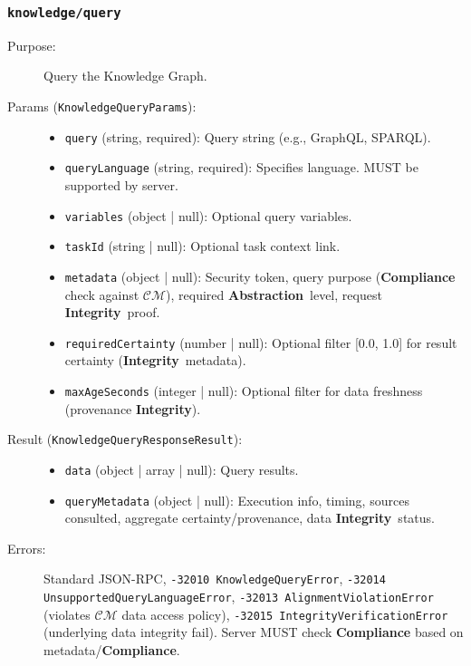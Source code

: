 \documentclass[12pt,a4paper]{report}
\newcommand{\Integrity}{\textbf{Integrity}}
\newcommand{\Abstraction}{\textbf{Abstraction}}
\begin{document}
	\subsubsection{\texttt{knowledge/query}}
	\label{app:oami_kg_query}
	\begin{description}
		\item[Purpose:] Query the Knowledge Graph.
		\item[Params (\texttt{KnowledgeQueryParams}):]
		\begin{itemize} \itemsep0em
			\item \texttt{query} (string, required): Query string (e.g., GraphQL, SPARQL).
			\item \texttt{queryLanguage} (string, required): Specifies language. MUST be supported by server.
			\item \texttt{variables} (object | null): Optional query variables.
			\item \texttt{taskId} (string | null): Optional task context link.
			\item \texttt{metadata} (object | null): Security token, query purpose (\textbf{Compliance} check against $\mathcal{CM}$), required \Abstraction\ level, request \Integrity\ proof.
			\item \texttt{requiredCertainty} (number | null): Optional filter [0.0, 1.0] for result certainty (\Integrity\ metadata).
			\item \texttt{maxAgeSeconds} (integer | null): Optional filter for data freshness (provenance \Integrity).
		\end{itemize}
		\item[Result (\texttt{KnowledgeQueryResponseResult}):]
		\begin{itemize} \itemsep0em
			\item \texttt{data} (object | array | null): Query results.
			\item \texttt{queryMetadata} (object | null): Execution info, timing, sources consulted, aggregate certainty/provenance, data \Integrity\ status.
		\end{itemize}
		\item[Errors:] Standard JSON-RPC, \texttt{-32010 KnowledgeQueryError}, \texttt{-32014 UnsupportedQueryLanguageError}, \texttt{-32013 AlignmentViolationError} (violates $\mathcal{CM}$ data access policy), \texttt{-32015 IntegrityVerificationError} (underlying data integrity fail). Server MUST check \textbf{Compliance} based on metadata/\textbf{Compliance}.
	\end{description}
	
\end{document}
